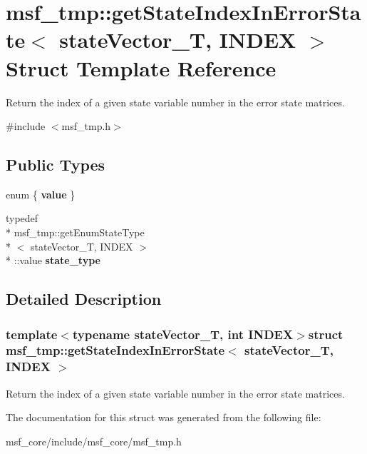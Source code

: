 \hypertarget{structmsf__tmp_1_1getStateIndexInErrorState}{\section{msf\-\_\-tmp\-:\-:get\-State\-Index\-In\-Error\-State$<$ state\-Vector\-\_\-\-T, I\-N\-D\-E\-X $>$ Struct Template Reference}
\label{structmsf__tmp_1_1getStateIndexInErrorState}
}


Return the index of a given state variable number in the error state matrices.  




{\ttfamily \#include $<$msf\-\_\-tmp.\-h$>$}

\subsection*{Public Types}
\begin{DoxyCompactItemize}
\item 
enum \{ {\bfseries value}
 \}
\item 
\hypertarget{structmsf__tmp_1_1getStateIndexInErrorState_a4a602d089be0d8af2d0faa443a2ce62e}{typedef \\*
msf\-\_\-tmp\-::get\-Enum\-State\-Type\\*
$<$ state\-Vector\-\_\-\-T, I\-N\-D\-E\-X $>$\\*
\-::value {\bfseries state\-\_\-type}}\label{structmsf__tmp_1_1getStateIndexInErrorState_a4a602d089be0d8af2d0faa443a2ce62e}

\end{DoxyCompactItemize}


\subsection{Detailed Description}
\subsubsection*{template$<$typename state\-Vector\-\_\-\-T, int I\-N\-D\-E\-X$>$struct msf\-\_\-tmp\-::get\-State\-Index\-In\-Error\-State$<$ state\-Vector\-\_\-\-T, I\-N\-D\-E\-X $>$}

Return the index of a given state variable number in the error state matrices. 

The documentation for this struct was generated from the following file\-:\begin{DoxyCompactItemize}
\item 
msf\-\_\-core/include/msf\-\_\-core/msf\-\_\-tmp.\-h\end{DoxyCompactItemize}
